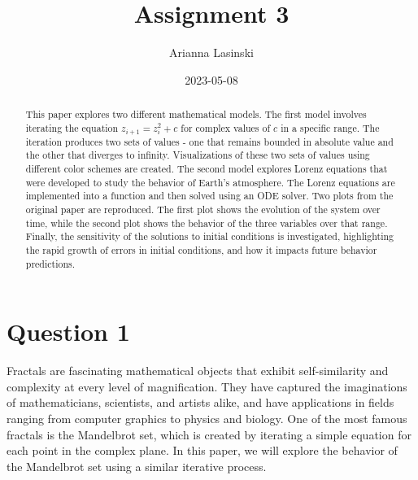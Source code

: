 \documentclass[letterpaper,10.9pt]{article}
\begin{document}
\title{Assignment 3}
\author{Arianna Lasinski}

\date{2023-05-08}

\maketitle



\begin{abstract}

This paper explores two different mathematical models. The first model involves iterating the equation $z_{i + 1} = z_i^2 + c$ for complex values of $c$ in a specific range. The iteration produces two sets of values - one that remains bounded in absolute value and the other that diverges to infinity. Visualizations of these two sets of values using different color schemes are created. The second model explores Lorenz equations that were developed to study the behavior of Earth's atmosphere. The Lorenz equations are implemented into a function and then solved using an ODE solver. Two plots from the original paper are reproduced. The first plot shows the evolution of the system over time, while the second plot shows the behavior of the three variables over that range. Finally, the sensitivity of the solutions to initial conditions is investigated, highlighting the rapid growth of errors in initial conditions, and how it impacts future behavior predictions.

\end{abstract}


\section{Question 1}

Fractals are fascinating mathematical objects that exhibit self-similarity and complexity at every level of magnification. They have captured the imaginations of mathematicians, scientists, and artists alike, and have applications in fields ranging from computer graphics to physics and biology. One of the most famous fractals is the Mandelbrot set, which is created by iterating a simple equation for each point in the complex plane. In this paper, we will explore the behavior of the Mandelbrot set using a similar iterative process.\\
\end{document}
